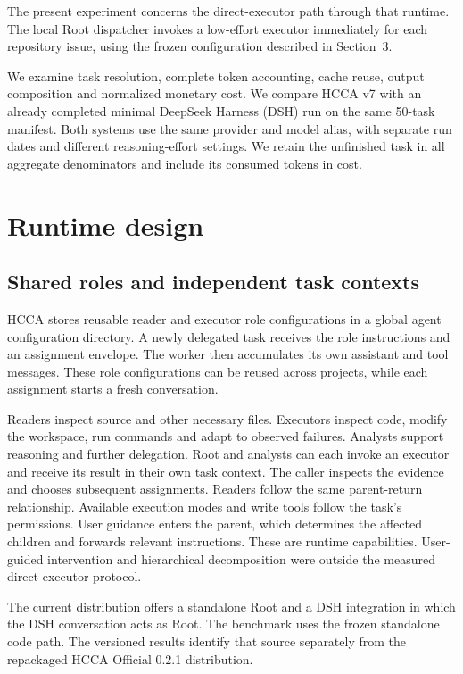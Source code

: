 \documentclass[10pt,a4paper]{article}
\begin{document}
The present experiment concerns the direct-executor path through that runtime.
The local Root dispatcher invokes a low-effort executor immediately for each
repository issue, using the frozen configuration described in Section~3.

We examine task resolution, complete token accounting, cache reuse, output
composition and normalized monetary cost. We compare HCCA v7 with an already
completed minimal DeepSeek Harness (DSH) run on the same 50-task manifest.
Both systems use the same provider and model alias, with separate run dates and
different reasoning-effort settings. We retain the unfinished task in all
aggregate denominators and include its consumed tokens in cost.

\section{Runtime design}

\subsection{Shared roles and independent task contexts}

HCCA stores reusable reader and executor role configurations in a global agent
configuration directory. A newly delegated task receives the role instructions
and an assignment envelope. The worker then accumulates its own assistant and
tool messages. These role configurations can be reused across projects, while
each assignment starts a fresh conversation.

Readers inspect source and other necessary files. Executors inspect code,
modify the workspace, run commands and adapt to observed failures. Analysts
support reasoning and further delegation. Root and analysts can each invoke
an executor and receive its result in their own task context. The caller
inspects the evidence and chooses subsequent assignments. Readers follow the
same parent-return relationship. Available execution modes and write tools
follow the task's permissions. User guidance enters the parent,
which determines the affected children and forwards relevant instructions.
These are runtime capabilities. User-guided intervention and hierarchical
decomposition were outside the measured direct-executor protocol.

The current distribution offers a standalone Root and a DSH integration in
which the DSH conversation acts as Root. The benchmark uses the frozen
standalone code path. The versioned results identify that source separately
from the repackaged HCCA Official 0.2.1 distribution.
\end{document}
